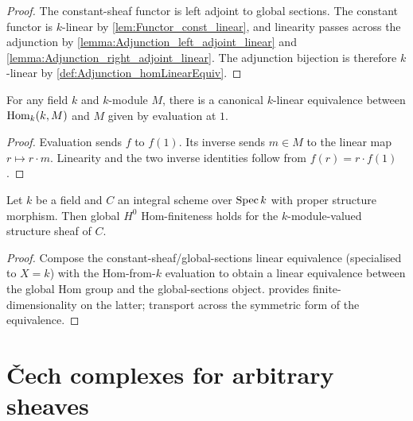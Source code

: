 \begin{proof}
  \leanok
  The constant-sheaf functor is left adjoint to global sections. The constant functor is \(k\)-linear by \cref{lem:Functor_const_linear}, and linearity passes across the adjunction by \cref{lemma:Adjunction_left_adjoint_linear} and \cref{lemma:Adjunction_right_adjoint_linear}. The adjunction bijection is therefore \(k\)-linear by \cref{def:Adjunction_homLinearEquiv}.
\end{proof}

\begin{theorem}\leanok
  \label{def:Scheme_homFromOne_linearEquiv}
  For any field \(k\) and \(k\)-module \(M\), there is a canonical \(k\)-linear equivalence between \(\operatorname{Hom}_k(k, M)\) and \(M\) given by evaluation at \(1\).
\end{theorem}

\begin{proof}
  \leanok
  Evaluation sends \(f\) to \(f(1)\). Its inverse sends \(m\in M\) to the linear map \(r\mapsto r\cdot m\). Linearity and the two inverse identities follow from \(f(r)=r\cdot f(1)\).
\end{proof}

\begin{theorem}\leanok
  \label{inst:Scheme_instIsHModuleHomFinite_toModuleKSheaf}
  Let \(k\) be a field and \(C\) an integral scheme over \(\operatorname{Spec} k\) with proper structure morphism. Then global \(H^0\) Hom-finiteness holds for the \(k\)-module-valued structure sheaf of \(C\).
\end{theorem}

\begin{proof}
  
  \leanok
  Compose the constant-sheaf/global-sections linear equivalence (specialised to \(X = k\)) with the Hom-from-\(k\) evaluation to obtain a linear equivalence between the global Hom group and the global-sections object.  provides finite-dimensionality on the latter; transport across the symmetric form of the equivalence.
\end{proof}

\section{\v{C}ech complexes for arbitrary sheaves}
\label{sec:moduleK_cech_parameterised}

